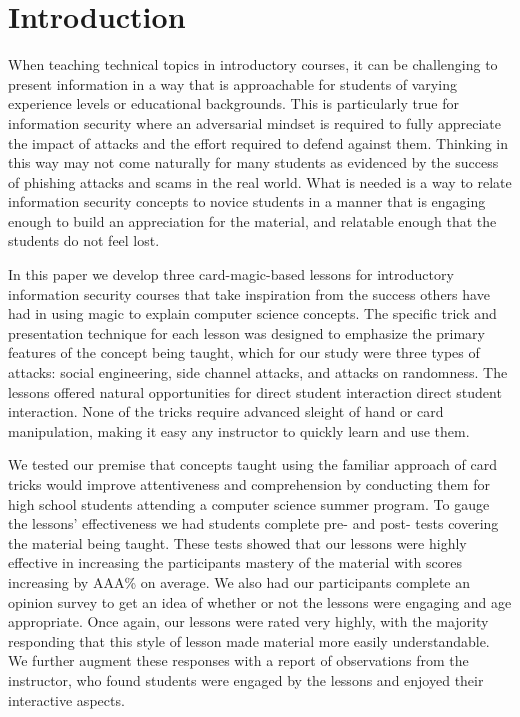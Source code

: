 \section{Introduction}
\label{SEC:introduction}

When teaching technical topics
in introductory courses,
it can be challenging
to present information
in a way that is approachable
for students of varying
experience levels
or educational backgrounds.
This is particularly true
for information security
where an adversarial mindset
is required
to fully appreciate the impact of attacks and the effort required to
defend against them.
Thinking in this way
may not come naturally
for many students
as evidenced
by the success of phishing attacks
and scams in the real world.
What is needed
is a way
to relate information security concepts
to novice students
in a manner
that is engaging enough
to build an appreciation for the material,
and relatable enough that the students do not feel lost.

In this paper
we develop three card-magic-based lessons
for introductory information security courses
that take inspiration
from the success others have had
in using magic
to explain computer science concepts.
The specific trick and presentation technique
for each lesson was designed to emphasize the primary
features of the concept being taught,
which for our study were three types of attacks:
social engineering,
side channel attacks,
and attacks on randomness.
The lessons offered natural opportunities
for direct student interaction direct student interaction.
None of the tricks require advanced sleight of hand
or card manipulation,
making it easy any instructor to quickly learn and use them.


We tested our premise that concepts taught using the familiar approach
of card tricks would improve attentiveness and comprehension
by conducting them for high school students
attending a computer science summer program.
To gauge the lessons'
effectiveness we had students complete pre- and post- tests covering the
material being taught.  These tests showed that our lessons were highly
effective in increasing the participants mastery of the material with scores
increasing by AAA\% on average.
We also had our participants complete an opinion survey to get an idea of
whether or not the lessons were engaging and age appropriate.  Once again, our
lessons were rated very highly,
with the majority responding that this style of lesson made material
more easily understandable.
We further augment these responses
with a report of observations
from the instructor,
who found students were engaged by the lessons and enjoyed their interactive
aspects.


